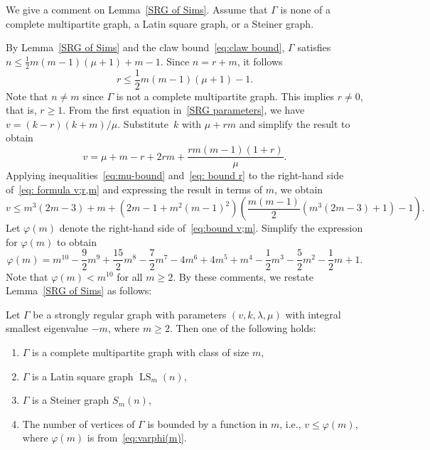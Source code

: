 We give a comment on Lemma~\ref{SRG of Sims}.
Assume that $\Gamma$ is none of a complete multipartite graph, a Latin square graph, or a Steiner graph.


By Lemma~\ref{SRG of Sims} and the claw bound~\eqref{eq:claw bound}, $\Gamma$ satisfies $n \leqslant \frac{1}{2}m(m-1)(\mu+1) +m-1$.
Since $n=r+m$, it follows 
\begin{equation}\label{eq: bound r}
	r\leqslant \frac{1}{2} m(m-1)(\mu+1)-1.
\end{equation}
Note that $n \ne m$ since $\Gamma$ is not a complete multipartite graph.
This implies $r \ne 0$, that is, $r \geqslant 1$.
From the first equation in~\eqref{SRG parameters}, we have $v = (k-r)(k+m)/\mu$. 
Substitute~$k$ with $\mu + rm$ and simplify the result to obtain
\begin{equation}\label{eq: formula v;r,m}
	v = \mu  + m - r + 2rm + \frac{rm(m-1)(1+r)}{\mu}. 
\end{equation}
Applying inequalities~\eqref{eq:mu-bound} and~\eqref{eq: bound r} to the right-hand side of~\eqref{eq: formula v;r,m} and expressing the result in terms of $m$, we obtain
\begin{equation}\label{eq:bound v;m}
	 v \leqslant m^3(2m-3) + m + \left(2m-1+m^2(m-1)^2\right)\left(\frac{m(m-1)}{2}\left(m^3(2m-3)+1\right)-1\right).
\end{equation}
Let $\varphi(m)$ denote the right-hand side of~\eqref{eq:bound v;m}. 
Simplify the expression for $\varphi(m)$ to obtain
\begin{equation}\label{eq:varphi(m)}
	\varphi(m) =  m^{10} - \frac{9}{2}m^9 +\frac{15}{2}m^8 - \frac{7}{2}m^7 - 4m^6 +4m^5 + m^4 - \frac{1}{2}m^3 - \frac{5}{2}m^2-\frac{1}{2}m + 1.
\end{equation}
Note that $\varphi(m) < m^{10}$ for all $m\geqslant 2$.
By these comments, we restate Lemma~\ref{SRG of Sims} as follows:

\begin{coro}\label{bound on order of SRG}
Let $\Gamma$ be a strongly regular graph with parameters $(v,k,\lambda, \mu)$ with integral smallest eigenvalue $-m$, where $m\geqslant 2$. 
Then one of the following holds:
\begin{enumerate}[\normalfont(i)]
  \item $\Gamma$ is a complete multipartite graph with class of size $m$,
  \item $\Gamma$ is a Latin square graph $\operatorname{LS}_m(n)$,
  \item $\Gamma$ is a Steiner graph $S_m(n)$,
  \item The number of vertices of $\Gamma$ is bounded by a function in $m$, i.e., $v \leqslant \varphi(m)$, where $\varphi(m)$ is from~\eqref{eq:varphi(m)}.
\end{enumerate}
\end{coro}


